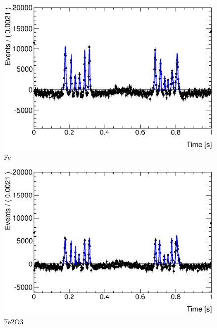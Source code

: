 \begin{figure}[htbp]
    \centering
        \includegraphics[scale=0.37, angle=0]{./Fe_172585_fit}
    \caption{Fe}
    \label{fig:Fe}
\end{figure}

\begin{figure}[htbp]
    \centering
        \includegraphics[scale=0.37, angle=0]{./Fe2O3_100000_fit}
    \caption{Fe2O3}
    \label{fig:Fe2O3}
\end{figure}

